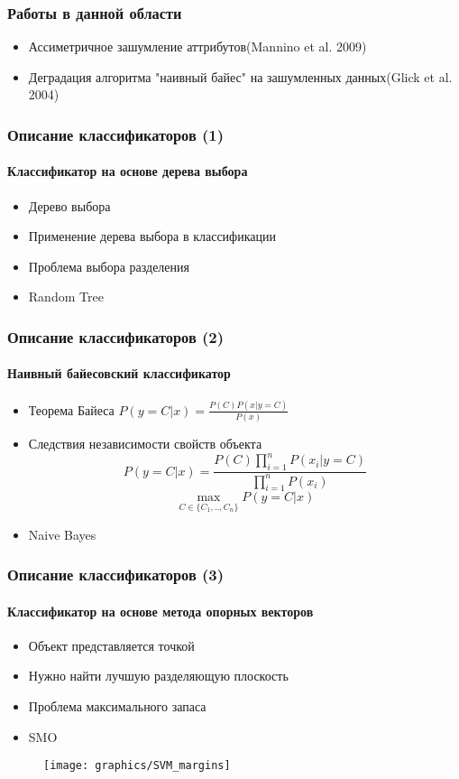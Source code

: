 \documentclass{beamer}
\begin{document}
  \begin{frame}
    \frametitle{Работы в данной области}
    \begin{itemize}
    	\item{Ассиметричное зашумление аттрибутов(Mannino et al. 2009)}
    	\item{Деградация алгоритма "наивный байес" на зашумленных данных(Glick et al. 2004)}
    \end{itemize}
  \end{frame}
  
  
  
  \begin{frame}
  \frametitle{Описание классификаторов (1)}
    \framesubtitle{Классификатор на основе дерева выбора}
    \begin{itemize}
    	\item{Дерево выбора}
    	\item{Применение дерева выбора в классификации}
    	\item{Проблема выбора разделения}
    	\item{Random Tree}
    \end{itemize}
  \end{frame}
  
  \begin{frame}
  \frametitle{Описание классификаторов (2)}
    \framesubtitle{Наивный байесовский классификатор}
    \begin{itemize}
    	\item{Теорема Байеса}
    		$P(y=C|x)=\frac{P(C) P(x|y=C)}{P(x)}$
    	\item{Следствия независимости свойств объекта\\}
    	$$P(y=C|x)=\frac{P(C) \prod_{i=1}^n{P(x_i|y=C)}}{\prod_{i=1}^n{P(x_i)}}$$
    	$$\max_{C \in \{C_1,..,C_n\}}P(y=C|x)$$
    	\item{Naive Bayes}
    \end{itemize}
  \end{frame}
  
  \begin{frame}
  \frametitle{Описание классификаторов (3)}
    \framesubtitle{Классификатор на основе метода опорных векторов}
    \begin{itemize}
    	\item{Объект представляется точкой}
    	\item{Нужно найти лучшую разделяющую плоскость}
    	\item{Проблема максимального запаса}
    	\item{SMO}
    \end{itemize}
    \begin{figure}
    \centering
    \texttt{[image: graphics/SVM\_margins]}
  \end{figure}
  \end{frame}
  
\end{document}
